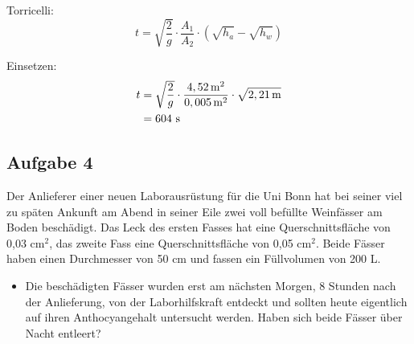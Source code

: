 \documentclass[a4paper,11pt]{article}
\newif\ifshowme
\begin{document}
\begin{marginfigure}[+2cm]
{\ppbig
Torricelli:
\begin{equation}
t = \sqrt{\frac{2}{g}} \cdot \frac{A_1}{A_2} \cdot (\sqrt{h_a} - \sqrt{h_w})
\end{equation}

Einsetzen:
\begin{align*}
t &= \sqrt{\frac{2}{g}} \cdot \frac{4,52\mskip3mu \text{m}^2}{0,005\mskip3mu \text{m}^2} \cdot \sqrt{2,21\mskip3mu \text{m}} \\
&= 604 ~\text{s}
\end{align*}
}



\pagebreak
\else
\fi
\pagebreak

\subsection*{Aufgabe 4}
Der Anlieferer einer neuen Laborausrüstung für die Uni Bonn hat bei seiner viel zu späten Ankunft am Abend in seiner Eile zwei voll befüllte Weinfässer am Boden beschädigt. Das Leck des ersten Fasses hat eine Querschnittsfläche von 0,03 cm$^2$, das zweite Fass eine Querschnittsfläche von 0,05 cm$^2$. Beide Fässer haben einen Durchmesser von 50 cm und fassen ein Füllvolumen von 200 L. \par 

\begin{marginfigure}[0cm]
\centering
{}
\end{marginfigure}
\ifshowme
\vspace*{0mm}
\else
\fi 
\begin{itemize}
\item Die beschädigten Fässer wurden erst am nächsten Morgen, 8 Stunden nach der Anlieferung, von der Laborhilfskraft entdeckt und sollten heute eigentlich auf ihren Anthocyangehalt untersucht werden. Haben sich beide Fässer über Nacht entleert?
\ifshowme
{}
\end{itemize}
\end{marginfigure}
\end{document}
